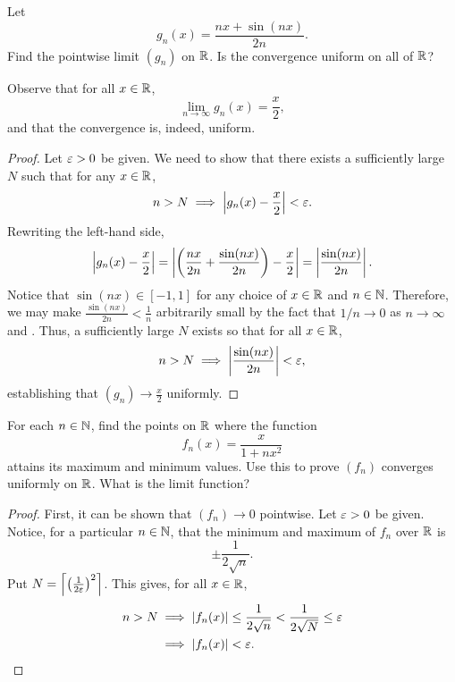 \begin{problem}
  Let
    \[
      g_{n}(x) = \frac{nx + \sin(nx)}{2n}.
    \]
  Find the pointwise limit $(g_{n})$ on $\mathbb{R}$. Is the convergence uniform on all of $\mathbb{R}$?
  \vspace{\baselineskip}

    Observe that for all $x \in \mathbb{R}$,
    \[
      \lim_{n \to \infty} g_{n}(x) = \frac{x}{2},
    \]
    and that the convergence is, indeed, uniform. 

    \begin{proof}
      Let $\varepsilon > 0$ be given. We need to show that there exists a sufficiently large $N$ such that for any $x \in \mathbb{R}$,
        \[
          n > N \implies \left\lvert g_{n}(x) - \frac{x}{2} \right\rvert < \varepsilon.
        \]
      Rewriting the left-hand side,
        \[
          \left\lvert g_{n}(x) - \frac{x}{2} \right\rvert = \left\lvert \left(\frac{nx}{2n} + \frac{\sin(nx)}{2n}\right) - \frac{x}{2} \right\rvert = \left\lvert \frac{\sin(nx)}{2n} \right\rvert.
        \]
      Notice that $\sin(nx) \in [-1, 1]$ for any choice of $x \in \mathbb{R}$ and $n \in \mathbb{N}$.
      Therefore, we may make $\frac{\sin(nx)}{2n} < \frac{1}{n}$ arbitrarily small by
      the fact that $1/n \to 0$ as $n \to \infty$ and .
      Thus, a sufficiently large $N$ exists so that for all $x \in \mathbb{R}$,
      \[
          n > N \implies \left\lvert \frac{\sin(nx)}{2n} \right\rvert < \varepsilon,
      \]
      establishing that $(g_{n}) \to \frac{x}{2}$ uniformly.
  \end{proof}
\end{problem}

\begin{problem}
  \label{prob:unif-conv-fn-with-max-min}
  For each $n \in \mathbb{N}$, find the points on $\mathbb{R}$ where the function
  \[
    f_{n}(x) = \frac{x}{1 + nx^{2}}
  \]
  attains its maximum and minimum values. Use this to prove $(f_{n})$ converges
  uniformly on $\mathbb{R}$. What is the limit function?

  \begin{proof}
    First, it can be shown that $(f_{n}) \to 0$ pointwise.
    Let $\varepsilon > 0$ be given. Notice, for a particular $n \in \mathbb{N}$, that the minimum and maximum
    of $f_{n}$ over $\mathbb{R}$ is 
    \[
      \pm \frac{1}{2\sqrt{n}}.
    \]
    Put $N = \left\lceil \left( \frac{1}{2\varepsilon} \right)^{2} \right\rceil$.
    This gives, for all $x \in \mathbb{R}$,
    \begin{align*}
      n > N &\implies \left\lvert f_{n}(x) \right\rvert \leq \frac{1}{2\sqrt{n}} < \frac{1}{2\sqrt{N}} \leq \varepsilon\\
            &\implies \left\lvert f_{n}(x) \right\rvert < \varepsilon.
    \end{align*}
  \end{proof}

\end{problem}

